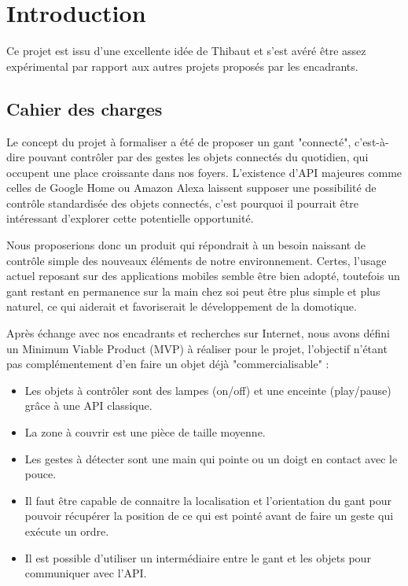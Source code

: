 \documentclass{article}
\begin{document}
    

    
    \tableofcontents

    \section{Introduction}

        Ce projet est issu d'une excellente idée de Thibaut et s'est avéré être assez expérimental par rapport aux autres projets proposés par les encadrants.

        \subsection{Cahier des charges}

        Le concept du projet à formaliser a été de proposer un gant "connecté", 
            c'est-à-dire pouvant contrôler par des gestes les objets connectés du quotidien,
            qui occupent une place croissante dans nos foyers. L'existence d'API majeures comme celles
            de Google Home ou Amazon Alexa laissent supposer une possibilité de contrôle standardisée
            des objets connectés, c'est pourquoi il pourrait être intéressant d'explorer cette
            potentielle opportunité.

        Nous proposerions donc un produit qui répondrait à un besoin naissant de contrôle simple des nouveaux
            éléments de notre environnement. Certes, l'usage actuel reposant sur des applications mobiles
            semble être bien adopté, toutefois un gant restant en permanence sur la main chez soi peut être plus
            simple et plus naturel, ce qui aiderait et favoriserait le développement de la domotique.

        Après échange avec nos encadrants et recherches sur Internet, nous avons défini un Minimum Viable Product (MVP)
            à réaliser pour le projet, l'objectif n'étant pas complémentement d'en faire un objet déjà
            "commercialisable" :
            \begin{itemize}
                \item Les objets à contrôler sont des lampes (on/off) et une enceinte (play/pause) grâce à une API classique.
                \item La zone à couvrir est une pièce de taille moyenne.
                \item Les gestes à détecter sont une main qui pointe ou un doigt en contact avec le pouce.
                \item Il faut être capable de connaitre la localisation et l'orientation du gant pour pouvoir
                        récupérer la position de ce qui est pointé
                        avant de faire un geste qui exécute un ordre.
                \item Il est possible d'utiliser un intermédiaire entre le gant et les objets pour communiquer avec l'API.
            \end{itemize}
\end{document}
